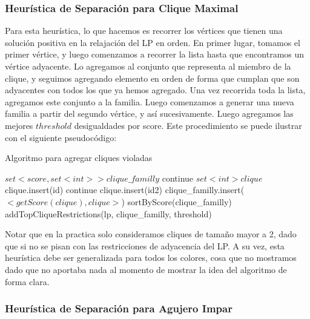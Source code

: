 \pagebreak

\subsubsection{Heurística de Separación para Clique Maximal}

Para esta heurística, lo que hacemos es recorrer los vértices que tienen una solución positiva en la relajación del LP en orden. En primer lugar, tomamos el primer vértice, y luego comenzamos a recorrer la lista hasta que encontramos un vértice adyacente. Lo agregamos al conjunto que representa al miembro de la clique, y seguimos agregando elemento en orden de forma que cumplan que son adyacentes con todos los que ya hemos agregado. Una vez recorrida toda la lista, agregamos este conjunto a la familia. Luego comenzamos a generar una nueva familia a partir del segundo vértice, y así sucesivamente. Luego agregamos las mejores $threshold$ desigualdades por score. Este procedimiento se puede ilustrar con el siguiente pseudocódigo:

\begin{algorithm}
\caption{Algoritmo para agregar cliques violadas}
\begin{algorithmic}[1]
\State $set<score, set<int>> clique\_familly$
		\State continue
	\EndIf
	\State $set<int> clique$
	\State clique.insert(id)
			\State continue
		\EndIf
			\State clique.insert(id2)
		\EndIf
	\EndFor
		\State clique\_familly.insert($<getScore(clique), clique>$)
	\EndIf
\EndFor
\State sortByScore(clique\_familly)
\State addTopCliqueRestrictions(lp, clique\_familly, threshold)
\EndProcedure
\end{algorithmic}
\end{algorithm}

Notar que en la practica solo consideramos cliques de tamaño mayor a 2, dado que si no se pisan con las restricciones de adyacencia del LP. A su vez, esta heurística debe ser generalizada para todos los colores, cosa que no mostramos dado que no aportaba nada al momento de mostrar la idea del algoritmo de forma clara.

\pagebreak

\subsubsection{Heurística de Separación para Agujero Impar}

